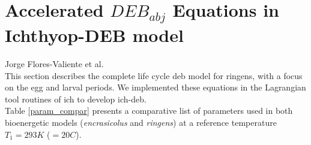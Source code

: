 %
%
%
%
%
%
%
%

\clearpage
\section{Accelerated $DEB_{abj}$ Equations in Ichthyop-DEB model}\label{DEBabjEqn}

Jorge Flores-Valiente et al.\\

This section describes the complete life cycle \acrshort{deb} model for \gls{ringens}, with a focus on the egg and larval periods. We implemented these equations in the Lagrangian tool routines of \gls{ich} \citep{LettVerl2008} to develop \gls{ich-deb}.\\

Table \ref{param_compar} presents a comparative list of parameters used in both bioenergetic models (\textit{\gls{encrasicolus}} and \textit{\gls{ringens}}) at a reference temperature $T_{1} = 293 K$  ($=20$\textdegree $C$).\\

